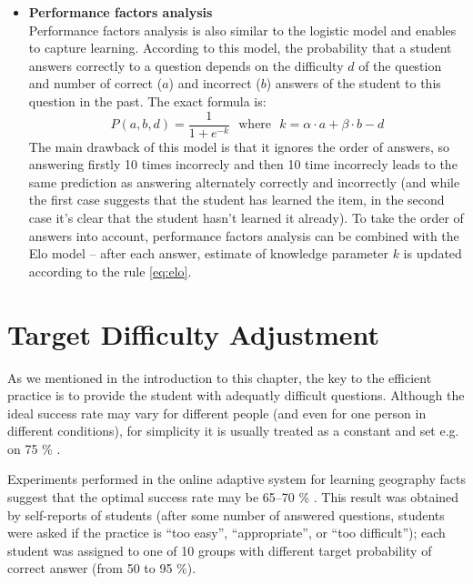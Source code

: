 \documentclass[a4paper, 12pt, twoside]{fithesis2}		%
\renewcommand{\_}{\leavevmode \kern0.07em\vbox{\hrule width0.4em}}
\newcommand{\squarebullet}{\textcolor{black}{\raisebox{0.15em}{\rule{4pt}{4pt}}}}
\newcommand{\emptysquarebullet}{\textcolor{black}{\raisebox{0.10em}{\tiny$\square$}}}
\newenvironment{myItemize}{
  \begin{itemize}[leftmargin=2em,rightmargin=1em,itemsep=\parskip ,parsep=0em,topsep=0em,partopsep=0em]
  \renewcommand{\labelitemi}{\squarebullet}
  \renewcommand{\labelitemii}{\textbullet}
}{
  \end{itemize}
}
\begin{document}
\begin{myItemize}
\item \textbf{Performance factors analysis}\\
  Performance factors analysis \cite{performance-factors-analysis} is also similar to the logistic model
  and enables to capture learning.
  According to this model, the probability that a student answers correctly to a question
  depends on the difficulty $d$ of the question and number of correct ($a$) and incorrect ($b$) answers of the student to this question in the past. The exact formula is:
  \begin{equation}\label{eq:pfa}
  P(a, b, d) = \frac{1}{1 + e^{-k}}
  \text{~~where~~} k = \alpha \cdot a + \beta \cdot b - d
  \end{equation}
  The main drawback of this model is that it ignores the order of answers,
  so answering firstly 10 times incorrecly and then 10 time incorrecly leads to the same prediction as answering alternately correctly and incorrectly (and while the first case suggests that the student has learned the item, in the second case it's clear that the student hasn't learned it already).
  To take the order of answers into account, performance factors analysis can be combined with the Elo model \cite{slepe-mapy} -- after each answer, estimate of knowledge parameter $k$ is updated according to the rule \ref{eq:elo}.
\end{myItemize}



\section{Target Difficulty Adjustment}
\label{sec:target-difficulty}

As we mentioned in the introduction to this chapter,
the key to the efficient practice is to provide the student with adequatly difficult questions.
Although the ideal success rate may vary for different people (and even for one person in different conditions),
for simplicity it is usually treated as a constant and set e.g. on 75 \% \cite{slepe-mapy, adaptive-practice-irt-math}.

Experiments performed in the online adaptive system for learning geography facts suggest that the optimal success rate may be 65--70 \% \cite{slepe-mapy-motivation}.
This result was obtained by self-reports of students (after some number of answered questions, students were asked if the practice is ``too easy'', ``appropriate'', or ``too difficult'');
each student was assigned to one of 10 groups with different target probability of correct answer (from 50 to 95 \%).
\end{document}
